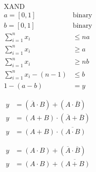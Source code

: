 \documentclass[conference]{IEEEtran}
\begin{document}
\begin{align}
	\text{XAND} \\
	a = [0,1] &\text{binary}\\
	b = [0,1] &\text{binary}\\
	\sum_{i=1}^{n}x_i &\leq na \\
	\sum_{i=1}^{n}x_i &\geq a\\
	\sum_{i=1}^{n}x_i &\geq nb \\
	\sum_{i=1}^{n}x_i-(n-1) &\leq b \\
	1-(a-b) &= y
\end{align}

\begin{align}
	y &= (\overline{A} \cdot B) + (A \cdot \overline{B}) \\
	y &= (A+B) \cdot (\overline{A}+\overline{B}) \\
	y &= (A+B) \cdot \overline{(A \cdot B)}
\end{align}

\begin{align}
	y &= (A \cdot B) + (\overline{A} \cdot \overline{B}) \\
	y &= (A \cdot B) + \overline{(A+B)}
\end{align}
	
\end{document}
